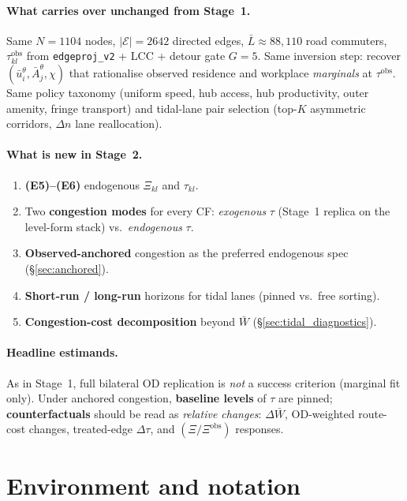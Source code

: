 \documentclass[12pt]{article}
\newcommand{\E}{\mathcal E}
\newcommand{\Lbar}{\bar L}
\newcommand{\Wbar}{\bar W}
\newcommand{\ubar}{\bar u}
\newcommand{\Abar}{\bar A}
\newcommand{\obs}{\mathrm{obs}}
\begin{document}
\paragraph{What carries over unchanged from Stage~1.}
Same $N=1104$ nodes, $|\E|=2642$ directed edges, $\Lbar\approx 88{,}110$ road
commuters, $\tau^{\obs}_{kl}$ from \texttt{edgeproj\_v2} + LCC + detour gate
$G=5$.
Same inversion step: recover $(\ubar_i^{\theta},\Abar_j^{\theta},\chi)$ that
rationalise observed residence and workplace \emph{marginals} at $\tau^{\obs}$.
Same policy taxonomy (uniform speed, hub access, hub productivity, outer amenity,
fringe transport) and tidal-lane pair selection (top-$K$ asymmetric corridors,
$\Delta n$ lane reallocation).

\paragraph{What is new in Stage~2.}
\begin{enumerate}[leftmargin=2em]
  \item \textbf{(E5)--(E6)} endogenous $\Xi_{kl}$ and $\tau_{kl}$.
  \item Two \textbf{congestion modes} for every CF: \emph{exogenous} $\tau$
        (Stage~1 replica on the level-form stack) vs.\ \emph{endogenous} $\tau$.
  \item \textbf{Observed-anchored} congestion as the preferred endogenous spec
        (§\ref{sec:anchored}).
  \item \textbf{Short-run / long-run} horizons for tidal lanes (pinned vs.\ free
        sorting).
  \item \textbf{Congestion-cost decomposition} beyond $\Wbar$
        (§\ref{sec:tidal_diagnostics}).
\end{enumerate}

\paragraph{Headline estimands.}
As in Stage~1, full bilateral OD replication is \emph{not} a success criterion
(marginal fit only).
Under anchored congestion, \textbf{baseline levels} of $\tau$ are pinned;
\textbf{counterfactuals} should be read as \emph{relative changes}:
$\Delta\Wbar$, OD-weighted route-cost changes, treated-edge $\Delta\tau$,
and $(\Xi/\Xi^{\obs})$ responses.

\section{Environment and notation}\label{sec:data}
\end{document}
